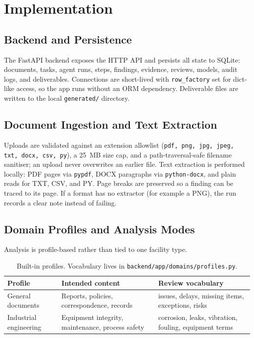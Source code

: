 \documentclass[11pt,a4paper]{article}
\begin{document}
\section{Implementation}

\subsection{Backend and Persistence}
The FastAPI backend exposes the HTTP API and persists all state to SQLite:
documents, tasks, agent runs, steps, findings, evidence, reviews, models,
audit logs, and deliverables. Connections are short-lived with
\texttt{row\_factory} set for dict-like access, so the app runs without an ORM
dependency. Deliverable files are written to the local \texttt{generated/}
directory.

\subsection{Document Ingestion and Text Extraction}
Uploads are validated against an extension allowlist
(\texttt{pdf, png, jpg, jpeg, txt, docx, csv, py}), a 25~MB size cap, and a
path-traversal-safe filename sanitiser; an upload never overwrites an earlier
file. Text extraction is performed locally: PDF pages via \texttt{pypdf},
DOCX paragraphs via \texttt{python-docx}, and plain reads for TXT, CSV, and PY.
Page breaks are preserved so a finding can be traced to its page. If a format
has no extractor (for example a PNG), the run records a clear note instead of
failing.

\subsection{Domain Profiles and Analysis Modes}
Analysis is profile-based rather than tied to one facility type.

\begin{table}[htbp]
\centering
\small
\begin{tabular}{@{}p{3.4cm} p{4.6cm} p{6.2cm}@{}}
\toprule
\textbf{Profile} & \textbf{Intended content} & \textbf{Review vocabulary} \\
\midrule
General documents & Reports, policies, correspondence, records & issues, delays, missing items, exceptions, risks \\
Industrial engineering & Equipment integrity, maintenance, process safety & corrosion, leaks, vibration, fouling, equipment terms \\
\bottomrule
\end{tabular}
\caption{Built-in profiles. Vocabulary lives in \texttt{backend/app/domains/profiles.py}.}
\end{table}
\end{document}
